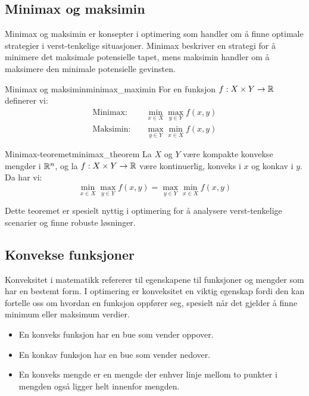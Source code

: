 \subsection{Minimax og maksimin}
Minimax og maksimin er konsepter i optimering som handler om å finne optimale strategier i verst-tenkelige situasjoner.
Minimax beskriver en strategi for å minimere det maksimale potensielle tapet, mens maksimin handler om å maksimere den minimale potensielle gevinsten.

\begin{definition}{Minimax og maksimin}{minimax_maximin}
	For en funksjon $f: X \times Y \to \mathbb{R}$ definerer vi:
	\begin{align*}
		\text{Minimax:}  & \quad \min_{x \in X} \max_{y \in Y} f(x,y) \\
		\text{Maksimin:} & \quad \max_{y \in Y} \min_{x \in X} f(x,y)
	\end{align*}
\end{definition}

\begin{theorem}{Minimax-teoremet}{minimax_theorem}
	La $X$ og $Y$ være kompakte konvekse mengder i $\mathbb{R}^n$, og la $f: X \times Y \to \mathbb{R}$ være kontinuerlig, konveks i $x$ og konkav i $y$. Da har vi:
	\[
		\min_{x \in X} \max_{y \in Y} f(x,y) = \max_{y \in Y} \min_{x \in X} f(x,y)
	\]
\end{theorem}

Dette teoremet er spesielt nyttig i optimering for å analysere verst-tenkelige scenarier og finne robuste løsninger.

\subsection{Konvekse funksjoner}
Konveksitet i matematikk refererer til egenskapene til funksjoner og mengder som har en bestemt form.
I optimering er konveksitet en viktig egenskap fordi den kan fortelle oss om hvordan en funksjon oppfører seg, spesielt når det gjelder å finne minimum eller maksimum verdier.

\begin{itemize}
	\item En konveks funksjon har en bue som vender oppover.
	\item En konkav funksjon har en bue som vender nedover.
	\item En konveks mengde er en mengde der enhver linje mellom to punkter i mengden også ligger helt innenfor mengden.
\end{itemize}

